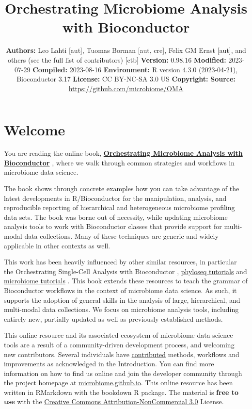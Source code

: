 \documentclass[
]{book}
\title{Orchestrating Microbiome Analysis with Bioconductor}
\author{}
\date{\vspace{-2.5em}\textbf{Authors:} Leo Lahti {[}aut{]}, Tuomas Borman {[}aut, cre{]}, Felix GM Ernst {[}aut{]}, and others (see the full list of contributors) {[}ctb{]} \textbf{Version:} 0.98.16 \textbf{Modified:} 2023-07-29 \textbf{Compiled:} 2023-08-16 \textbf{Environment:} R version 4.3.0 (2023-04-21), Bioconductor 3.17 \textbf{License:} CC BY-NC-SA 3.0 US \textbf{Copyright:} \textbf{Source:} \url{https://github.com/microbiome/OMA}}
\begin{document}
\maketitle

{
\setcounter{tocdepth}{1}
\tableofcontents
}
\hypertarget{welcome}{%
\chapter*{Welcome}\label{welcome}}

You are reading the online book, \href{https://microbiome.github.io/OMA/}{\textbf{Orchestrating Microbiome Analysis
with Bioconductor}} \citep{OMA}, where we
walk through common strategies and workflows in microbiome data
science.

The book shows through concrete examples how you can take advantage of
the latest developments in R/Bioconductor for the manipulation,
analysis, and reproducible reporting of hierarchical and heterogeneous
microbiome profiling data sets. The book was borne out of necessity,
while updating microbiome analysis tools to work with Bioconductor
classes that provide support for multi-modal data collections. Many of
these techniques are generic and widely applicable in other contexts
as well.

This work has been heavily influenced by other similar resources, in
particular the Orchestrating Single-Cell Analysis with Bioconductor
\citep{Amezquita2020}, \href{http://joey711.github.io/phyloseq/tutorials-index}{phyloseq
tutorials}
\citep{Callahan2016} and \href{https://microbiome.github.io/tutorials/}{microbiome
tutorials} \citep{Shetty2019}.
This book extends these resources to teach the grammar of Bioconductor
workflows in the context of microbiome data science. As such, it
supports the adoption of general skills in the analysis of large,
hierarchical, and multi-modal data collections. We focus on microbiome
analysis tools, including entirely new, partially updated as well as
previously established methods.

This online resource and its associated ecosystem of microbiome data
science tools are a result of a community-driven development process,
and welcoming new contributors. Several individuals have
\href{https://github.com/microbiome/OMA/graphs/contributors}{contributed}
methods, workflows and improvements as acknowledged in the
Introduction. You can find more information on how to find us online
and join the developer community through the project homepage at
\href{https://microbiome.github.io}{microbiome.github.io}. This online
resource has been written in RMarkdown with the bookdown R
package. The material is \textbf{free to use} with the \href{https://creativecommons.org/licenses/by-nc/3.0/us/}{Creative Commons
Attribution-NonCommercial
3.0} License.
\end{document}

